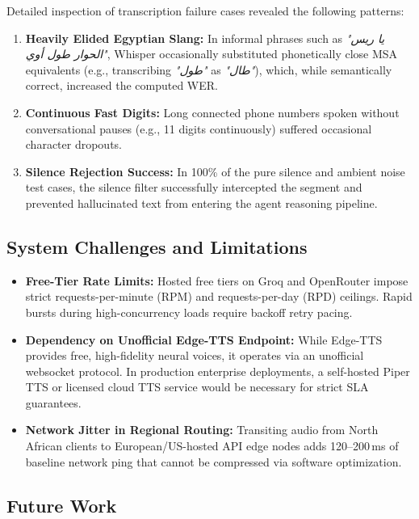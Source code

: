 Detailed inspection of transcription failure cases revealed the following patterns:
\begin{enumerate}
    \item \textbf{Heavily Elided Egyptian Slang:} In informal phrases such as \textit{"يا ريس الحوار طول أوي"}, Whisper occasionally substituted phonetically close MSA equivalents (e.g., transcribing \textit{"طول"} as \textit{"طال"}), which, while semantically correct, increased the computed WER.
    \item \textbf{Continuous Fast Digits:} Long connected phone numbers spoken without conversational pauses (e.g., 11 digits continuously) suffered occasional character dropouts.
    \item \textbf{Silence Rejection Success:} In 100\% of the pure silence and ambient noise test cases, the silence filter successfully intercepted the segment and prevented hallucinated text from entering the agent reasoning pipeline.
\end{enumerate}

\subsection{System Challenges and Limitations}
\label{subsec:challenges_limitations}

\begin{itemize}
    \item \textbf{Free-Tier Rate Limits:} Hosted free tiers on Groq and OpenRouter impose strict requests-per-minute (RPM) and requests-per-day (RPD) ceilings. Rapid bursts during high-concurrency loads require backoff retry pacing.
    \item \textbf{Dependency on Unofficial Edge-TTS Endpoint:} While Edge-TTS provides free, high-fidelity neural voices, it operates via an unofficial websocket protocol. In production enterprise deployments, a self-hosted Piper TTS or licensed cloud TTS service would be necessary for strict SLA guarantees.
    \item \textbf{Network Jitter in Regional Routing:} Transiting audio from North African clients to European/US-hosted API edge nodes adds 120--200\,ms of baseline network ping that cannot be compressed via software optimization.
\end{itemize}

\subsection{Future Work}
\label{subsec:future_work}

